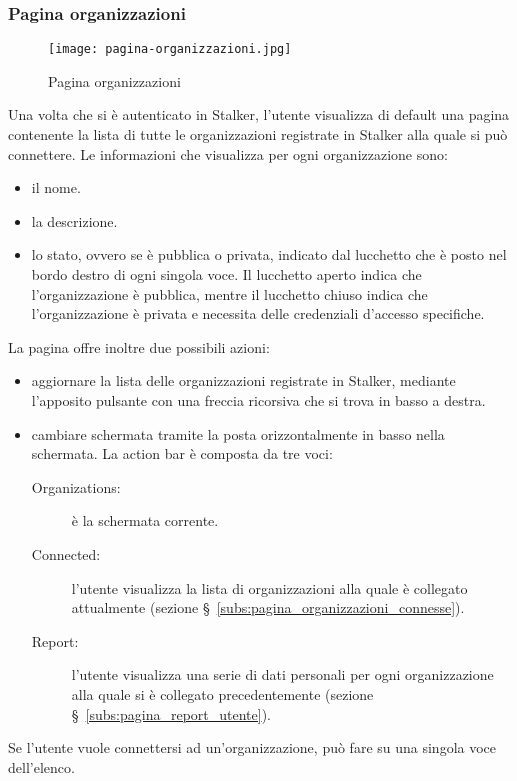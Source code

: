 \documentclass[../manuale-utente.tex]{subfiles}
\begin{document}
\subsubsection{Pagina organizzazioni}%
\label{subs:pagina_organizzazioni}

\begin{figure}[H]
    \centering
    \texttt{[image: pagina-organizzazioni.jpg]}
    \caption{Pagina organizzazioni}%
    \label{fig:mobile_app_pagina_organizzazioni}
\end{figure}
Una volta che si è autenticato in Stalker, l'utente visualizza di default una pagina contenente la lista di tutte le organizzazioni registrate in Stalker alla quale si può connettere.
Le informazioni che visualizza per ogni organizzazione sono:
\begin{itemize}
  \item il nome.
  \item la descrizione.
  \item lo stato, ovvero se è pubblica o privata, indicato dal lucchetto che è posto nel bordo destro di ogni singola voce. Il lucchetto aperto indica che l'organizzazione è pubblica, mentre il lucchetto chiuso indica che l'organizzazione è privata e necessita delle credenziali d'accesso specifiche.
\end{itemize}
La pagina offre inoltre due possibili azioni:
\begin{itemize}
  \item aggiornare la lista delle organizzazioni registrate in Stalker, mediante l'apposito pulsante con una freccia ricorsiva che si trova in basso a destra.
  \item cambiare schermata tramite la  posta orizzontalmente in basso nella schermata. La action bar è composta da tre voci:
  \begin{description}
    \item[Organizations:] è la schermata corrente.
    \item[Connected:] l'utente visualizza la lista di organizzazioni alla quale è collegato attualmente (sezione §~\ref{subs:pagina_organizzazioni_connesse}).
    \item[Report:] l'utente visualizza una serie di dati personali per ogni organizzazione alla quale si è collegato precedentemente (sezione §~\ref{subs:pagina_report_utente}).
  \end{description}
\end{itemize}
Se l'utente vuole connettersi ad un'organizzazione, può fare  su una singola voce dell'elenco.
\end{document}
